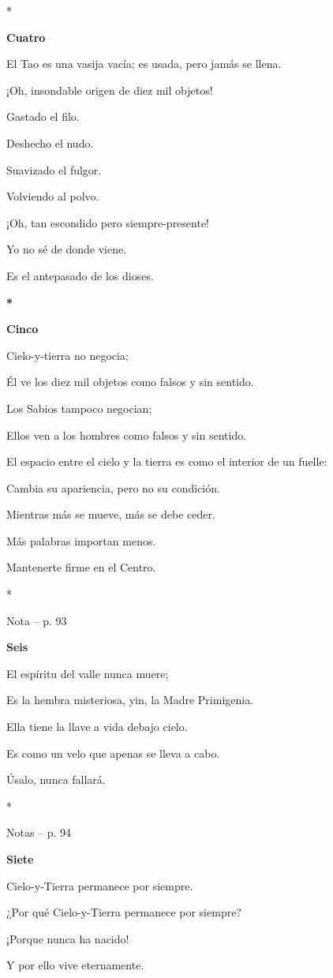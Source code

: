 *

\textbf{Cuatro}

El Tao es una vasija vacía; es usada, pero jamás se llena.

¡Oh, insondable origen de diez mil objetos!

Gastado el filo.

Deshecho el nudo.

Suavizado el fulgor.

Volviendo al polvo.

¡Oh, tan escondido pero siempre-presente!

Yo no sé de donde viene.

Es el antepasado de los dioses.

\textbf{*}

\textbf{Cinco}

Cielo-y-tierra no negocia;

Él ve los diez mil objetos como falsos y sin sentido.

Los Sabios tampoco negocian;

Ellos ven a los hombres como falsos y sin sentido.

El espacio entre el cielo y la tierra es como el interior de un fuelle:

Cambia su apariencia, pero no su condición.

Mientras más se mueve, más se debe ceder.

Más palabras importan menos.

Mantenerte firme en el Centro.

*

Nota -- p. 93

\textbf{Seis}

El espíritu del valle nunca muere;

Es la hembra misteriosa, yin, la Madre Primigenia.

Ella tiene la llave a vida debajo cielo.

Es como un velo que apenas se lleva a cabo.

Úsalo, nunca fallará.

*

Notas -- p. 94

\textbf{Siete}

Cielo-y-Tierra permanece por siempre.

¿Por qué Cielo-y-Tierra permanece por siempre?

¡Porque nunca ha nacido!

Y por ello vive eternamente.

